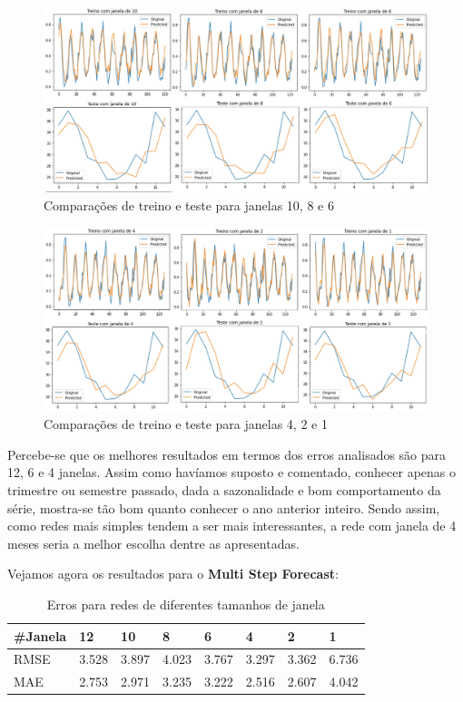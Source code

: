 \documentclass[12pt]{article}
\begin{document}
	\begin{figure}[H]
		\centering
		\includegraphics[width=0.9\linewidth]{Imagens/janelas/janelas6a10.jpg}
		\caption{Comparações de treino e teste para janelas 10, 8 e 6}
		\label{fig:janelas6a10}
	\end{figure}

	\begin{figure}[H]
		\centering
		\includegraphics[width=0.9\linewidth]{Imagens/janelas/janelas1a4.jpg}
		\caption{Comparações de treino e teste para janelas 4, 2 e 1}
		\label{fig:janelas1a4}
	\end{figure}
	
	Percebe-se que os melhores resultados em termos dos erros analisados são para 12, 6 e 4 janelas. Assim como havíamos suposto e comentado, conhecer apenas o trimestre ou semestre passado, dada a sazonalidade e bom comportamento da série, mostra-se tão bom quanto conhecer o ano anterior inteiro. Sendo assim, como redes mais simples tendem a ser mais interessantes, a rede com janela de 4 meses seria a melhor escolha dentre as apresentadas.
	
	
	Vejamos agora os resultados para o \textbf{Multi Step Forecast}:
	
	\begin{table}[H]
		\centering
		\begin{tabular}{|l|l|l|l|l|l|l|l|}
			\hline
			\#Janela & 12    & 10    & 8     & 6     & 4     & 2     & 1     \\ \hline
			RMSE     & 3.528 & 3.897 & 4.023 & 3.767 & 3.297 & 3.362 & 6.736 \\ \hline
			MAE      & 2.753 & 2.971 & 3.235 & 3.222 & 2.516 & 2.607 & 4.042 \\ \hline
		\end{tabular}
		\caption{Erros para redes de diferentes tamanhos de janela}
	\end{table}
\end{document}
